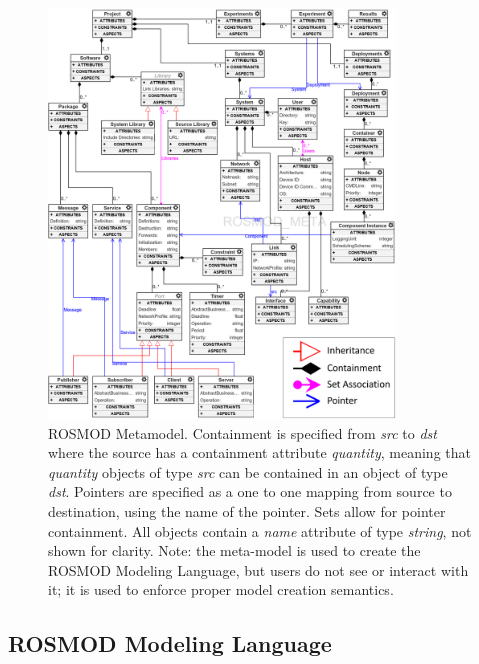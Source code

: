 \begin{figure}[ht]
	\centering
        \includegraphics[width=0.82\textwidth]{./Figures/ROSMOD-Meta2.png}
	\caption{ROSMOD Metamodel.  Containment is specified from
          \emph{src} to \emph{dst} where the source has a containment
          attribute \emph{quantity}, meaning that \emph{quantity}
          objects of type \emph{src} can be contained in an object of
          type \emph{dst}. Pointers are specified as a one to one
          mapping from source to destination, using the name of the
          pointer.  Sets allow for pointer containment.  All objects
          contain a \emph{name} attribute of type \emph{string}, not
          shown for clarity.  Note: the meta-model is used to create
          the ROSMOD Modeling Language, but users do not see or
          interact with it; it is used to enforce proper model
          creation semantics. }
	\label{fig:ROSMOD_Project}	
\end{figure}

\subsection{ROSMOD Modeling Language}

